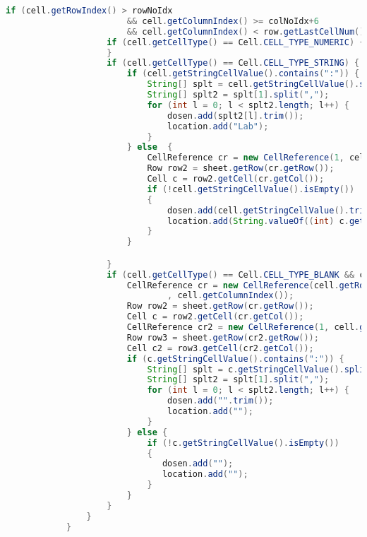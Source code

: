 \begin{lstlisting}[language=Java,basicstyle=\tiny,caption=ExcelConverter.java sebelum revisi,label=lst:ExcelConverterLama]
                if (cell.getRowIndex() > rowNoIdx 
                        && cell.getColumnIndex() >= colNoIdx+6 
                        && cell.getColumnIndex() < row.getLastCellNum()) {
                    if (cell.getCellType() == Cell.CELL_TYPE_NUMERIC) {
                    }
                    if (cell.getCellType() == Cell.CELL_TYPE_STRING) {
                        if (cell.getStringCellValue().contains(":")) {
                            String[] splt = cell.getStringCellValue().split(":");
                            String[] splt2 = splt[1].split(",");
                            for (int l = 0; l < splt2.length; l++) {
                                dosen.add(splt2[l].trim());
                                location.add("Lab");
                            }
                        } else  {
                            CellReference cr = new CellReference(1, cell.getColumnIndex());
                            Row row2 = sheet.getRow(cr.getRow());
                            Cell c = row2.getCell(cr.getCol());
                            if (!cell.getStringCellValue().isEmpty())
                            {
                                dosen.add(cell.getStringCellValue().trim());
                                location.add(String.valueOf((int) c.getNumericCellValue()).trim());
                            }
                        }

                    }
                    if (cell.getCellType() == Cell.CELL_TYPE_BLANK && cell.getRowIndex() > 2) {
                        CellReference cr = new CellReference(cell.getRowIndex() - 1
                                , cell.getColumnIndex());
                        Row row2 = sheet.getRow(cr.getRow());
                        Cell c = row2.getCell(cr.getCol());
                        CellReference cr2 = new CellReference(1, cell.getColumnIndex());
                        Row row3 = sheet.getRow(cr2.getRow());
                        Cell c2 = row3.getCell(cr2.getCol());
                        if (c.getStringCellValue().contains(":")) {
                            String[] splt = c.getStringCellValue().split(":");
                            String[] splt2 = splt[1].split(",");
                            for (int l = 0; l < splt2.length; l++) {
                                dosen.add("".trim());
                                location.add("");
                            }
                        } else {
                            if (!c.getStringCellValue().isEmpty())
                            {
                               dosen.add("");
                               location.add("");
                            }
                        }
                    }
                } 
            }


\end{lstlisting}

